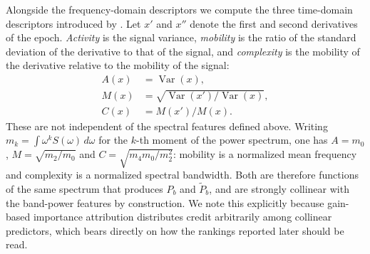 Alongside the frequency-domain descriptors we compute the three time-domain
descriptors introduced by \citet{hjorth1970}. Let $x'$ and $x''$ denote the
first and second derivatives of the epoch. \emph{Activity} is the signal
variance, \emph{mobility} is the ratio of the standard deviation of the
derivative to that of the signal, and \emph{complexity} is the mobility of
the derivative relative to the mobility of the signal:
%
\begin{align}
A(x) &= \operatorname{Var}(x), \label{eq:activity}\\
M(x) &= \sqrt{\operatorname{Var}(x') \big/ \operatorname{Var}(x)},
\label{eq:mobility}\\
C(x) &= M(x') \big/ M(x). \label{eq:complexity}
\end{align}
%
These are not independent of the spectral features defined above.
Writing $m_k = \int \omega^{k} S(\omega)\,d\omega$
for the $k$-th moment of the power spectrum, one has $A = m_0$,
$M = \sqrt{m_2/m_0}$ and $C = \sqrt{m_4 m_0 / m_2^{2}}$: mobility is a
normalized mean frequency and complexity is a normalized spectral
bandwidth. Both are therefore functions of the same spectrum that produces
$P_b$ and $\tilde{P}_b$, and are strongly collinear with the band-power
features by construction. We note this explicitly because gain-based
importance attribution distributes credit arbitrarily among collinear
predictors, which bears directly on how the rankings reported later should
be read.



